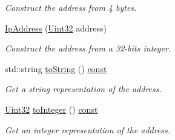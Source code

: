\begin{DoxyCompactItemize}
\begin{DoxyCompactList}\small\item\em Construct the address from 4 bytes. \end{DoxyCompactList}\item 
\hyperlink{classsf_1_1_ip_address_a8ed34ba3a40d70eb9f09ac5ae779a162}{Ip\-Address} (\hyperlink{namespacesf_aa746fb1ddef4410bddf198ebb27e727c}{Uint32} address)
\begin{DoxyCompactList}\small\item\em Construct the address from a 32-\/bits integer. \end{DoxyCompactList}\item 
std\-::string \hyperlink{classsf_1_1_ip_address_a52f4be92fb0ceb689abc469e4a85fd82}{to\-String} () \hyperlink{term__entry_8h_a57bd63ce7f9a353488880e3de6692d5a}{const} 
\begin{DoxyCompactList}\small\item\em Get a string representation of the address. \end{DoxyCompactList}\item 
\hyperlink{namespacesf_aa746fb1ddef4410bddf198ebb27e727c}{Uint32} \hyperlink{classsf_1_1_ip_address_af42678b08b23def2560aed7d98b24d89}{to\-Integer} () \hyperlink{term__entry_8h_a57bd63ce7f9a353488880e3de6692d5a}{const} 
\begin{DoxyCompactList}\small\item\em Get an integer representation of the address. \end{DoxyCompactList}\end{DoxyCompactItemize}
